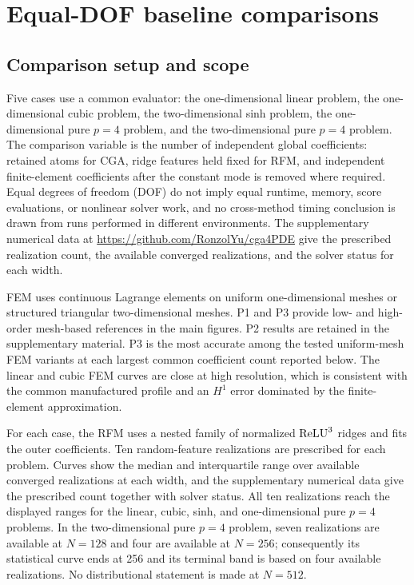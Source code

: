 \section{Equal-DOF baseline comparisons}
\label{sec:results}

\subsection{Comparison setup and scope}

Five cases use a common evaluator: the one-dimensional linear problem, the one-dimensional cubic
problem, the two-dimensional sinh problem, the one-dimensional pure \(p=4\) problem, and the
two-dimensional pure \(p=4\) problem. The comparison variable is the number of independent global
coefficients: retained atoms for CGA, ridge features held fixed for RFM, and independent
finite-element coefficients after the constant mode is removed where required. Equal degrees of
freedom (DOF) do not imply equal runtime, memory, score evaluations, or nonlinear solver work, and
no cross-method timing conclusion is drawn from runs performed in different environments.
The supplementary numerical data at
\url{https://github.com/RonzolYu/cga4PDE} give the prescribed realization count, the
available converged realizations, and the solver status for each width.

FEM uses continuous Lagrange elements on uniform one-dimensional meshes or structured triangular
two-dimensional meshes.  P1 and P3 provide low- and high-order mesh-based references in the main
figures. P2 results are retained in the supplementary material. P3 is the most accurate among the tested uniform-mesh FEM variants
at each largest common coefficient count reported below. The linear and cubic FEM curves are close
at high resolution, which is consistent with the common manufactured profile and an \(H^1\) error
dominated by the finite-element approximation.

For each case, the RFM uses a nested family of normalized \(\operatorname{ReLU}^3\) ridges and fits the outer
coefficients. Ten random-feature realizations are prescribed for each problem. Curves show the median and
interquartile range over available converged realizations at each width, and the supplementary numerical data give
the prescribed count together with solver status. All ten
realizations reach the displayed ranges for the linear, cubic, sinh, and one-dimensional pure
\(p=4\) problems. In the two-dimensional pure \(p=4\) problem, seven realizations are available at
\(N=128\) and four are available at \(N=256\); consequently its statistical curve ends at 256 and its terminal band is based
on four available realizations.  No distributional statement is made at \(N=512\).

